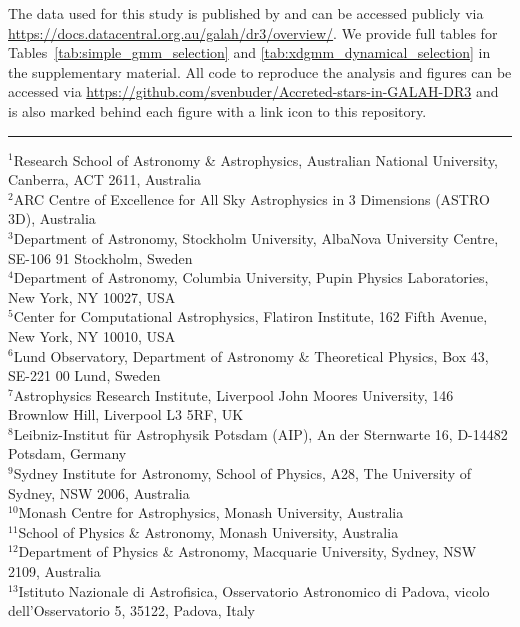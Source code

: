 \documentclass[fleqn,usenatbib]{mnras}
\begin{document}
The data used for this study is published by \citet{Buder2021} and can be accessed publicly via \url{https://docs.datacentral.org.au/galah/dr3/overview/}.
We provide full tables for Tables~\ref{tab:simple_gmm_selection} and \ref{tab:xdgmm_dynamical_selection} in the supplementary material. All code to reproduce the analysis and figures can be accessed via \url{https://github.com/svenbuder/Accreted-stars-in-GALAH-DR3} and is also marked behind each figure with a link icon to this repository.



\noindent \rule{8.5cm}{1pt}
\noindent
$^{1}$Research School of Astronomy \& Astrophysics, Australian National University, Canberra, ACT 2611, Australia\\
$^{2}$ARC Centre of Excellence for All Sky Astrophysics in 3 Dimensions (ASTRO 3D), Australia\\
$^{3}$Department of Astronomy, Stockholm University, AlbaNova University Centre, SE-106 91 Stockholm, Sweden\\
$^{4}$Department of Astronomy, Columbia University, Pupin Physics Laboratories, New York, NY 10027, USA\\
$^{5}$Center for Computational Astrophysics, Flatiron Institute, 162 Fifth Avenue, New York, NY 10010, USA\\
$^{6}$Lund Observatory, Department of Astronomy \& Theoretical Physics, Box 43, SE-221 00 Lund, Sweden\\
$^{7}$Astrophysics Research Institute, Liverpool John Moores University, 146 Brownlow Hill, Liverpool L3 5RF, UK \\
$^{8}$Leibniz-Institut f{\"u}r Astrophysik Potsdam (AIP), An der Sternwarte 16, D-14482 Potsdam, Germany\\
$^{9}$Sydney Institute for Astronomy, School of Physics, A28, The University of Sydney, NSW 2006, Australia\\
$^{10}$Monash Centre for Astrophysics, Monash University, Australia\\
$^{11}$School of Physics \& Astronomy, Monash University, Australia\\
$^{12}$Department of Physics \& Astronomy, Macquarie University, Sydney, NSW 2109, Australia\\
$^{13}$Istituto Nazionale di Astrofisica, Osservatorio Astronomico di Padova, vicolo dell'Osservatorio 5, 35122, Padova, Italy\\
\end{document}
